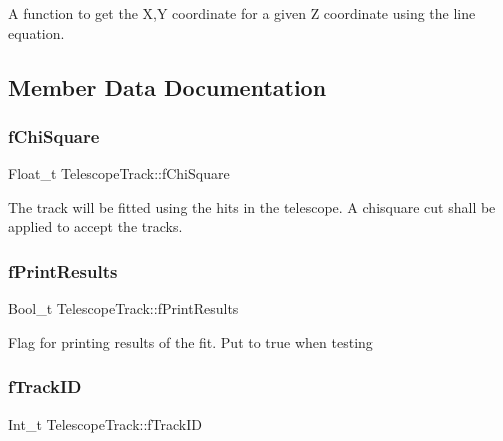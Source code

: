 A function to get the X,Y coordinate for a given Z coordinate using the line equation. 

\subsection{Member Data Documentation}
\mbox{\label{class_telescope_track_a0254ea60690e1f619a64191b1ae1e726}} 
\subsubsection{\texorpdfstring{f\+Chi\+Square}{fChiSquare}}
{\footnotesize\ttfamily Float\+\_\+t Telescope\+Track\+::f\+Chi\+Square\hspace{0.3cm}{\ttfamily [private]}}

The track will be fitted using the hits in the telescope. A chisquare cut shall be applied to accept the tracks. \mbox{\label{class_telescope_track_ad7ef1d1faa561a6921cd1442d8856e64}} 
\subsubsection{\texorpdfstring{f\+Print\+Results}{fPrintResults}}
{\footnotesize\ttfamily Bool\+\_\+t Telescope\+Track\+::f\+Print\+Results\hspace{0.3cm}{\ttfamily [private]}}

Flag for printing results of the fit. Put to true when testing \mbox{\label{class_telescope_track_a64977c9f478eba9beb2ae6026e0b7e0a}} 
\subsubsection{\texorpdfstring{f\+Track\+ID}{fTrackID}}
{\footnotesize\ttfamily Int\+\_\+t Telescope\+Track\+::f\+Track\+ID\hspace{0.3cm}{\ttfamily [private]}}

